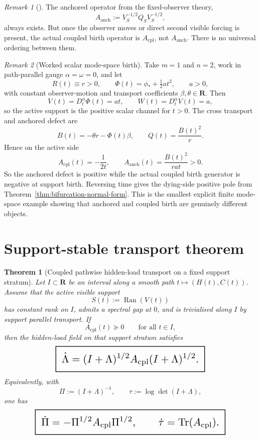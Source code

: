 \documentclass[11pt,a4paper]{article}
\numberwithin{equation}{section}
\DeclareMathOperator{\Tr}{Tr}
\DeclareMathOperator{\Ran}{Ran}
\newcommand{\R}{\mathbf R}
\newcommand{\geomboxed}[1]{%
  \setlength{\fboxsep}{8pt}%
  \setlength{\fboxrule}{0.9pt}%
  \fbox{\scalebox{1.5}{$\displaystyle #1$}}%
}
\theoremstyle{thmcompact}
\newtheorem{theorem}{Theorem}[section]
\theoremstyle{remark}
\newtheorem*{remarkplain}{Remark}
\newenvironment{remark}[1][]%
{\begin{remarkbox}\begin{remarkplain}[#1]\normalfont}
{\end{remarkplain}\end{remarkbox}}
\begin{document}
\begin{remark}
The anchored operator from the fixed-observer theory,
\[
A_{\mathrm{anch}}:=V_S^{-1/2}Q_SV_S^{-1/2},
\]
always exists. But once the observer moves or direct second visible forcing is present, the actual coupled birth operator is $A_{\mathrm{cpl}}$, not $A_{\mathrm{anch}}$. There is no universal ordering between them.
\end{remark}

\begin{remark}[Worked scalar mode-space birth]
Take $m=1$ and $n=2$, work in path-parallel gauge $\alpha=\omega=0$, and let
\[
R(t)\equiv r>0,
\qquad
\Phi(t)=\phi_\ast+\tfrac12 a t^2,
\qquad
a>0,
\]
with constant observer-motion and transport coefficients $\beta,\theta\in\R$. Then
\[
V(t)=D_t^\alpha\Phi(t)=at,
\qquad
W(t)=D_t^\alpha V(t)=a,
\]
so the active support is the positive scalar channel for $t>0$. The cross transport and anchored defect are
\[
B(t)=-\theta r-\Phi(t)\beta,
\qquad
Q(t)=\frac{B(t)^2}{r}.
\]
Hence on the active side
\begin{equation}
A_{\mathrm{cpl}}(t)=-\frac{1}{2t},
\qquad
A_{\mathrm{anch}}(t)=\frac{B(t)^2}{rat}>0.
\label{eq:scalar-mode-birth}
\end{equation}
So the anchored defect is positive while the actual coupled birth generator is negative at support birth. Reversing time gives the dying-side positive pole from Theorem~\ref{thm:bifurcation-normal-form}. This is the smallest explicit finite mode-space example showing that anchored and coupled birth are genuinely different objects.
\end{remark}

\section{Support-stable transport theorem}

\begin{theorem}[Coupled pathwise hidden-load transport on a fixed support stratum]
\label{thm:support-stable-transport}
Let $I\subset\R$ be an interval along a smooth path $t\mapsto(H(t),C(t))$. Assume that the active visible support
\[
S(t):=\Ran(V(t))
\]
has constant rank on $I$, admits a spectral gap at $0$, and is trivialised along $I$ by support parallel transport. If
\begin{equation}
A_{\mathrm{cpl}}(t)\succeq0
\qquad\text{for all }t\in I,
\label{eq:support-stable-positivity}
\end{equation}
then the hidden-load field on that support stratum satisfies
\begin{equation}
\geomboxed{
\dot\Lambda
=
(I+\Lambda)^{1/2}A_{\mathrm{cpl}}(I+\Lambda)^{1/2}.
}
\label{eq:Lambda-cpl-transport}
\end{equation}
Equivalently, with
\[
\Pi:=(I+\Lambda)^{-1},
\qquad
\tau:=\log\det(I+\Lambda),
\]
one has
\begin{equation}
\geomboxed{
\dot\Pi=-\Pi^{1/2}A_{\mathrm{cpl}}\Pi^{1/2},
\qquad
\dot\tau=\Tr(A_{\mathrm{cpl}}).
}
\label{eq:Pi-tau-cpl-transport}
\end{equation}
\end{theorem}
\end{document}
